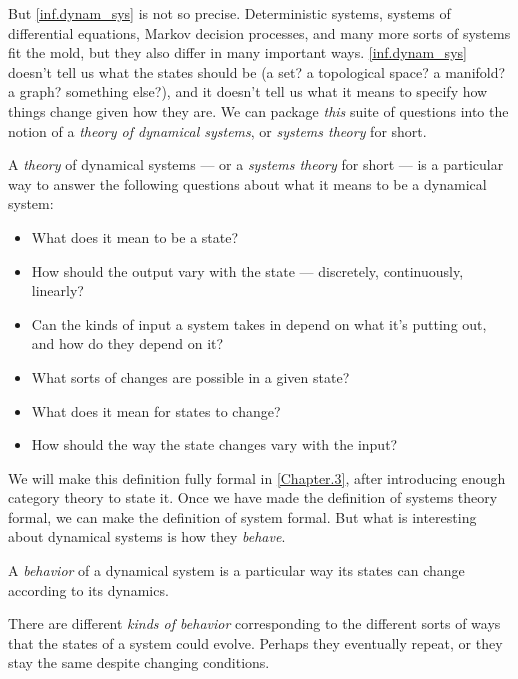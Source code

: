 \documentclass[DynamicalBook]{subfiles}
\begin{document}
But \cref{inf.dynam_sys} is not so precise. Deterministic systems, systems of differential equations, Markov decision processes, and many more sorts of systems fit the mold, but they also differ in many important ways. \cref{inf.dynam_sys} doesn't tell us what the states should be (a set? a topological space? a manifold? a graph? something else?), and it doesn't tell us what it means to specify how things change given how they are. We can package \emph{this} suite of questions into the notion of a \emph{theory of dynamical systems}, or \emph{systems theory} for short.

\begin{informal}\label{informal.doctrine}
  A \emph{theory} of dynamical systems --- or a \emph{systems theory} for short --- is a particular way to answer the following
  questions about what it means to be a dynamical system:
  \begin{itemize}
  \item What does it mean to be a state?
  \item How should the output vary with the state --- discretely,
    continuously, linearly?
  \item Can the kinds of input a
    system takes in depend on what it's putting out, and how do they depend on it?
  \item What sorts of changes are possible in a given state?
  \item What does it mean for states to change?
  \item How should the way the state changes vary with the input?
  \end{itemize}
\end{informal}

We will make this definition fully formal in \cref{Chapter.3}, after introducing enough category theory to state it. Once we have made the definition of systems theory formal, we can make the definition of system formal. But what is interesting about dynamical systems is how they \emph{behave}.
\begin{informal}\label{inf:behavior}
  A \emph{behavior} of a dynamical system is a particular way its states can
  change according to its dynamics.

  There are different \emph{kinds of behavior} corresponding to the different
  sorts of ways that the states of a system could evolve. Perhaps they eventually
  repeat, or they stay the same despite changing conditions.
\end{informal}
\end{document}
